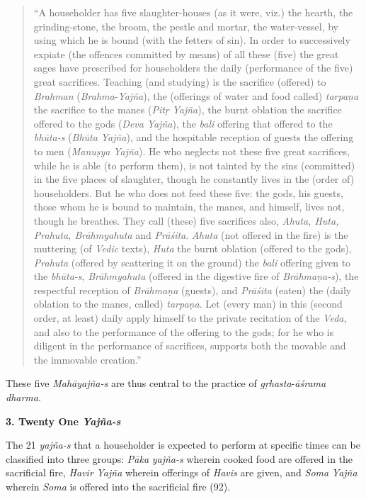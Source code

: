 \begin{quote}
``A householder has five slaughter-houses (as it were, viz.) the hearth, the grinding-stone, the broom, the pestle and mortar, the water-vessel, by using which he is bound (with the fetters of sin). In order to successively expiate (the offences committed by means) of all these (five) the great sages have prescribed for householders the daily (performance of the five) great sacrifices. Teaching (and studying) is the sacrifice (offered) to \emph{Brahman} (\emph{Brahma}-\emph{Yajña}), the (offerings of water and food called) \emph{tarpaṇa} the sacrifice to the manes (\emph{Pitṛ} \emph{Yajña}), the burnt oblation the sacrifice offered to the gods (\emph{Deva} \emph{Yajña}), the \emph{bali} offering that offered to the \emph{bhūta-s} (\emph{Bhūta} \emph{Yajña}), and the hospitable reception of guests the offering to men (\emph{Manuṣya} \emph{Yajña}). He who neglects not these five great sacrifices, while he is able (to perform them), is not tainted by the sins (committed) in the five places of slaughter, though he constantly lives in the (order of) householders. But he who does not feed these five: the gods, his guests, those whom he is bound to maintain, the manes, and himself, lives not, though he breathes. They call (these) five sacrifices also, \emph{Ahuta, Huta, Prahuta, Brāhmyahuta} and \emph{Prāśita}. \emph{Ahuta} (not offered in the fire) is the muttering (of \emph{Vedic} texts), \emph{Huta} the burnt oblation (offered to the gods), \emph{Prahuta} (offered by scattering it on the ground) the \emph{bali} offering given to the \emph{bhūta-s}, \emph{Brāhmyahuta} (offered in the digestive fire of \emph{Brāhmaṇa-s}), the respectful reception of \emph{Brāhmaṇa} (guests), and \emph{Prāśita} (eaten) the (daily oblation to the manes, called) \emph{tarpaṇa}. Let (every man) in this (second order, at least) daily apply himself to the private recitation of the \emph{Veda}, and also to the performance of the offering to the gods; for he who is diligent in the performance of sacrifices, supports both the movable and the immovable creation.''
\end{quote}

These five \emph{Mahāyajña-s} are thus central to the practice of \emph{gṛhasta}-\emph{āśrama} \emph{dharma}.

\textbf{3. Twenty One \emph{Yajña-s}}

The 21 \emph{yajña-s} that a householder is expected to perform at specific times can be classified into three groups: \emph{Pāka} \emph{yajña-s} wherein cooked food are offered in the sacrificial fire, \emph{Havir} \emph{Yajña} wherein offerings of \emph{Havis} are given, and \emph{Soma} \emph{Yajña} wherein \emph{Soma} is offered into the sacrificial fire (92).
\medskip

